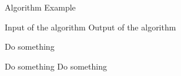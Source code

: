 \documentclass{article}
\begin{document}
\begin{algorithm}[htb]
\caption{Algorithm Example}
\label{alg:algorithm}
\begin{algorithmic}
\Require Input of the algorithm
\Ensure Output of the algorithm

\State Do something

     
        \State Do something
    \EndFor
        \State Do something
    \EndIf
\EndFor
\end{algorithmic}
\end{algorithm}



\clearpage

\printbibliography
\end{document}
